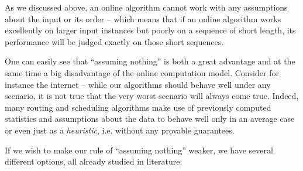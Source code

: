 As we discussed above, an online algorithm cannot work with any assumptions
about the input or its order -- which means that if an online algorithm works
excellently on larger input instances but poorly on a sequence of short length,
its performance will be judged exactly on those short sequences.

One can easily see that ``assuming nothing'' is both a great advantage
and at the same time a big disadvantage of the online computation
model. Consider for instance the internet -- while our algorithms
should behave well under any scenario, it is not true that the very
worst scenario will always come true. Indeed, many routing and
scheduling algorithms make use of previously computed statistics and
assumptions about the data to behave well only in an average case or
even just as a \textit{heuristic}, i.e. without any provable guarantees.

If we wish to make our rule of ``assuming nothing'' weaker, we have
several different options, all already studied in literature:

